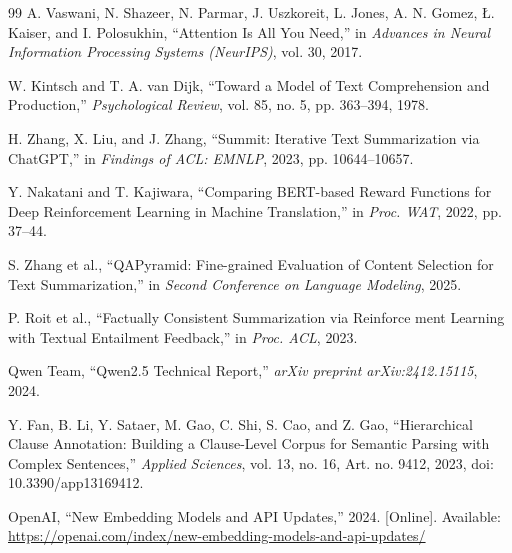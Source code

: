 \documentclass[conference]{IEEEtran}
\begin{document}
\begin{thebibliography}{99}
A. Vaswani, N. Shazeer, N. Parmar, J. Uszkoreit,
L. Jones, A. N. Gomez, {\L}. Kaiser, and I. Polosukhin,
``Attention Is All You Need,''
in \emph{Advances in Neural Information Processing Systems (NeurIPS)},
vol. 30, 2017.

W. Kintsch and T. A. van Dijk,
``Toward a Model of Text Comprehension and Production,''
\emph{Psychological Review},
vol. 85, no. 5, pp. 363--394, 1978.

H. Zhang, X. Liu, and J. Zhang,
``Summit: Iterative Text Summarization via ChatGPT,''
in \emph{Findings of ACL: EMNLP},
2023, pp. 10644--10657.

Y. Nakatani and T. Kajiwara,
``Comparing BERT-based Reward Functions for Deep Reinforcement Learning in Machine Translation,''
in \emph{Proc. WAT},
2022, pp. 37--44.

S. Zhang et al.,
``QAPyramid: Fine-grained Evaluation of Content Selection for Text Summarization,''
in \emph{Second Conference on Language Modeling},
2025.

P. Roit et al.,
``Factually Consistent Summarization via Reinforce
ment Learning with Textual Entailment Feedback,''
in \emph{Proc. ACL},
2023.

Qwen Team,
``Qwen2.5 Technical Report,''
\emph{arXiv preprint arXiv:2412.15115},
2024.

Y. Fan, B. Li, Y. Sataer, M. Gao, C. Shi, S. Cao, and Z. Gao,
``Hierarchical Clause Annotation: Building a Clause-Level Corpus for Semantic Parsing with Complex Sentences,''
\emph{Applied Sciences}, vol. 13, no. 16, Art. no. 9412, 2023,
doi: 10.3390/app13169412.

OpenAI,
``New Embedding Models and API Updates,''
2024.
[Online]. Available:
\url{https://openai.com/index/new-embedding-models-and-api-updates/}
\end{thebibliography}
\end{document}
